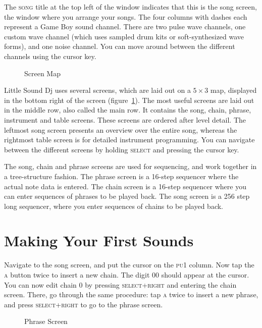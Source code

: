 The \textsc{song} title at the top left of the window indicates that this is the song screen, the
window where you arrange your songs. The four columns with dashes each represent a
Game Boy sound channel. There are two pulse wave channels, one custom wave channel
(which uses sampled drum kits or soft-synthesized wave forms), and one noise channel. You
can move around between the different channels using the cursor key.
\begin{figure}[hbtp]
\centering
{}
\caption{Screen Map}
\label{fig:map}
\end{figure}

Little Sound Dj uses several screens, which are laid out on a \begin{math} 5 \times 3 \end{math} map, displayed in the
bottom right of the screen (figure~\ref{fig:map}). The most useful screens are laid out in the middle row, also called
the main row. It contains the song, chain, phrase, instrument and table screens. These screens
are ordered after level detail. The leftmost song screen presents an overview over the entire
song, whereas the rightmost table screen is for detailed instrument programming. You can
navigate between the different screens by holding \textsc{select} and pressing the cursor key.

The song, chain and phrase screens are used for sequencing, and work together in a tree-structure
fashion. The phrase screen is a 16-step sequencer where the actual note data is
entered. The chain screen is a 16-step sequencer where you can enter sequences of phrases to
be played back. The song screen is a 256 step long sequencer, where you enter sequences of
chains to be played back.

\section{Making Your First Sounds}
Navigate to the song screen, and put the cursor on the \textsc{pu1} column. Now tap the \textsc{a} button
twice to insert a new chain. The digit 00 should appear at the cursor. You can now edit chain 0 by pressing \textsc{select+right} and entering the chain screen. There, go through the
same procedure: tap \textsc{a} twice to insert a new phrase, and press \textsc{select+right} to go to the
phrase screen.

\begin{figure}[hbtp]
\centering
{}
\caption{Phrase Screen}
\label{fig:phrase1}
\end{figure}

